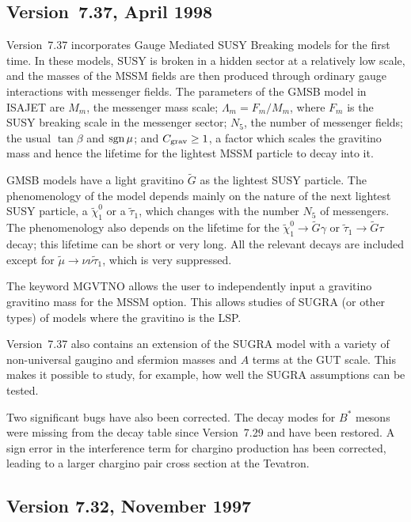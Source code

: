\subsection{Version~7.37, April 1998}

        Version~7.37 incorporates Gauge Mediated SUSY Breaking models
for the first time. In these models, SUSY is broken in a hidden sector
at a relatively low scale, and the masses of the MSSM fields are then
produced through ordinary gauge interactions with messenger fields.
The parameters of the GMSB model in ISAJET are $M_m$, the messenger
mass scale; $\Lambda_m = F_m/M_m$, where $F_m$ is the SUSY breaking
scale in the messenger sector; $N_5$, the number of messenger fields;
the usual $\tan\beta$ and $\mathop{\rm sgn}\mu$; and $C_{\rm grav} \ge 1$, a
factor which scales the gravitino mass and hence the lifetime for the
lightest MSSM particle to decay into it.

        GMSB models have a light gravitino $\tilde G$ as the lightest
SUSY particle. The phenomenology of the model depends mainly on the
nature of the next lightest SUSY particle, a $\tilde\chi_1^0$ or a
$\tilde\tau_1$, which changes with the number $N_5$ of messengers. The
phenomenology also depends on the lifetime for the $\tilde\chi_1^0 \to
\tilde G \gamma$ or $\tilde\tau_1 \to \tilde G \tau$ decay; this
lifetime can be short or very long. All the relevant decays are
included except for $\tilde\mu \to \nu \nu \tilde\tau_1$, which is very
suppressed.

        The keyword MGVTNO allows the user to independently input a
gravitino gravitino mass for the MSSM option. This allows studies of
SUGRA (or other types) of models where the gravitino is the LSP.

        Version~7.37 also contains an extension of the SUGRA model
with a variety of non-universal gaugino and sfermion masses and $A$
terms at the GUT scale. This makes it possible to study, for example,
how well the SUGRA assumptions can be tested.

        Two significant bugs have also been corrected. The decay modes
for $B^*$ mesons were missing from the decay table since Version~7.29
and have been restored. A sign error in the interference term for
chargino production has been corrected, leading to a larger chargino
pair cross section at the Tevatron.

\subsection{Version 7.32, November 1997}

